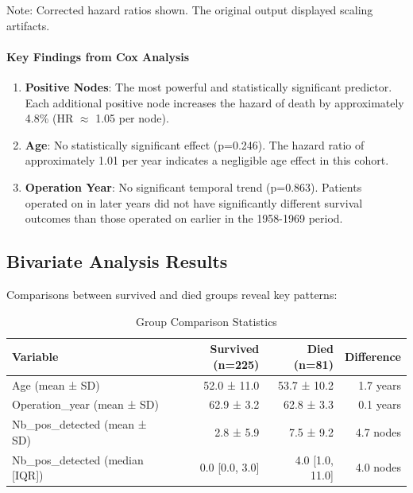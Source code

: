 \documentclass[12pt,a4paper]{article}
\begin{document}
Note: Corrected hazard ratios shown. The original output displayed scaling artifacts.

\paragraph{Key Findings from Cox Analysis}

\begin{enumerate}
    \item \textbf{Positive Nodes}: The most powerful and statistically significant predictor. Each additional positive node increases the hazard of death by approximately 4.8\% (HR $\approx$ 1.05 per node).
    
    \item \textbf{Age}: No statistically significant effect (p=0.246). The hazard ratio of approximately 1.01 per year indicates a negligible age effect in this cohort.
    
    \item \textbf{Operation Year}: No significant temporal trend (p=0.863). Patients operated on in later years did not have significantly different survival outcomes than those operated on earlier in the 1958-1969 period.
\end{enumerate}

\subsection{Bivariate Analysis Results}

Comparisons between survived and died groups reveal key patterns:

\begin{table}[H]
\centering
\caption{Group Comparison Statistics}
\label{tab:group_comparison}
\begin{tabular}{lrrr}
\toprule
\textbf{Variable} & \textbf{Survived (n=225)} & \textbf{Died (n=81)} & \textbf{Difference} \\
\midrule
Age (mean ± SD) & 52.0 ± 11.0 & 53.7 ± 10.2 & 1.7 years \\
Operation\_year (mean ± SD) & 62.9 ± 3.2 & 62.8 ± 3.3 & 0.1 years \\
Nb\_pos\_detected (mean ± SD) & 2.8 ± 5.9 & 7.5 ± 9.2 & 4.7 nodes \\
\midrule
Nb\_pos\_detected (median [IQR]) & 0.0 [0.0, 3.0] & 4.0 [1.0, 11.0] & 4.0 nodes \\
\bottomrule
\end{tabular}
\end{table}
\end{document}
